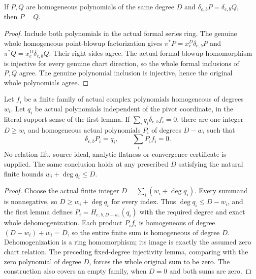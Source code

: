 \begin{lemma}
\label{hir:actual-homogeneous-polynomial-dehomogenization-injective}
\leanok
If $P,Q$ are homogeneous polynomials of the same degree $D$ and
$\delta_{e,b}P=\delta_{e,b}Q$, then $P=Q$.
\end{lemma}
\begin{proof}
Include both polynomials in the actual formal series ring. The genuine
whole homogeneous point-blowup factorization gives
$\pi^*P=x_e^D\delta_{e,b}P$ and
$\pi^*Q=x_e^D\delta_{e,b}Q$. Their right sides agree. The actual formal
blowup homomorphism is injective for every genuine chart direction,
so the whole formal inclusions of $P,Q$ agree. The genuine polynomial
inclusion is injective, hence the original whole polynomials agree.
\end{proof}

\begin{theorem}
\label{hir:actual-finite-polynomial-chart-relation-rehomogenization}
\leanok
Let $f_i$ be a finite family of actual complex polynomials homogeneous
of degrees $w_i$. Let $q_i$ be actual polynomials independent of the
pivot coordinate, in the literal support sense of the first lemma.
If $\sum_iq_i\delta_{e,b}f_i=0$, there are one integer $D\ge w_i$
and homogeneous actual polynomials $P_i$ of degrees $D-w_i$ such that
\[
 \delta_{e,b}P_i=q_i,\qquad \sum_iP_if_i=0.
\]
No relation lift, source ideal, analytic flatness or convergence
certificate is supplied.
The same conclusion holds at any prescribed $D$ satisfying the natural
finite bounds $w_i+\deg q_i\le D$.
\end{theorem}
\begin{proof}
Choose the actual finite integer $D=\sum_i(w_i+\deg q_i)$.
Every summand is nonnegative, so $D\ge w_i+\deg q_i$ for every index.
Thus $\deg q_i\le D-w_i$, and the first lemma defines
$P_i=H_{e,b,D-w_i}(q_i)$ with the required degree and exact
whole dehomogenization. Each product $P_if_i$ is homogeneous of
degree $(D-w_i)+w_i=D$, so the entire finite sum is homogeneous
of degree $D$. Dehomogenization is a ring homomorphism; its image
is exactly the assumed zero chart relation. The preceding fixed-degree
injectivity lemma, comparing with the zero polynomial of degree $D$,
forces the whole original sum to be zero. The construction also covers
an empty family, when $D=0$ and both sums are zero.
\end{proof}
